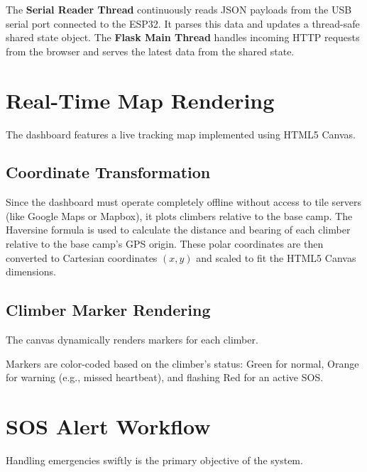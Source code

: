 The \textbf{Serial Reader Thread} continuously reads JSON payloads from the USB serial port connected to the ESP32. It parses this data and updates a thread-safe shared state object. The \textbf{Flask Main Thread} handles incoming HTTP requests from the browser and serves the latest data from the shared state.

\section{Real-Time Map Rendering}

The dashboard features a live tracking map implemented using HTML5 Canvas.

\subsection{Coordinate Transformation}
Since the dashboard must operate completely offline without access to tile servers (like Google Maps or Mapbox), it plots climbers relative to the base camp. The Haversine formula is used to calculate the distance and bearing of each climber relative to the base camp's GPS origin. These polar coordinates are then converted to Cartesian coordinates $(x, y)$ and scaled to fit the HTML5 Canvas dimensions.

\subsection{Climber Marker Rendering}
The canvas dynamically renders markers for each climber. 
\begin{tipbox}
Markers are color-coded based on the climber's status: Green for normal, Orange for warning (e.g., missed heartbeat), and flashing Red for an active SOS.
\end{tipbox}

\section{SOS Alert Workflow}

Handling emergencies swiftly is the primary objective of the system.

